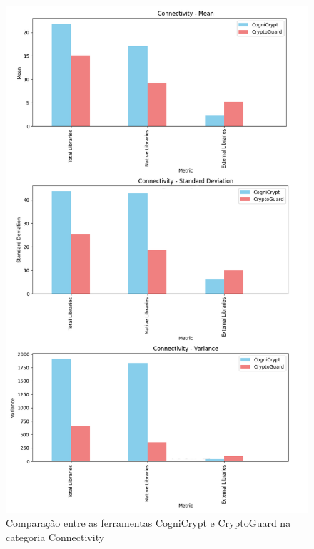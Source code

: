 \begin{figure}[!ht]
  \centering
  \includegraphics[scale=0.6]{img/plot_cc_x_cg_connectivity.png}
  \caption{Comparação entre as ferramentas CogniCrypt e CryptoGuard na categoria Connectivity}
  \label{img: CCvsCG_Connectivity}
\end{figure}

\FloatBarrier

